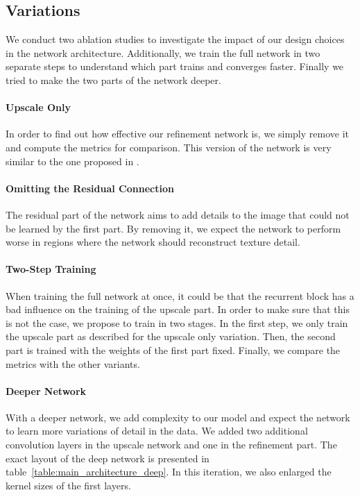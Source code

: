 \documentclass[11pt]{article}
\begin{document}
\subsection{Variations}

We conduct two ablation studies to investigate the impact of our design choices in the network architecture. 
Additionally, we train the full network in two separate steps to understand which part trains and converges faster. 
Finally we tried to make the two parts of the network deeper.

\paragraph{Upscale Only}

In order to find out how effective our refinement network is, we simply remove it and compute the metrics for comparison.
This version of the network is very similar to the one proposed in \citet{dong2016image}.

\paragraph{Omitting the Residual Connection}

The residual part of the network aims to add details to the image that could not be learned by the first part.
By removing it, we expect the network to perform worse in regions where the network should reconstruct texture detail.

\paragraph{Two-Step Training}

When training the full network at once, it could be that the recurrent block has a bad influence on the training of the upscale part.
In order to make sure that this is not the case, we propose to train in two stages.
In the first step, we only train the upscale part as described for the upscale only variation. 
Then, the second part is trained with the weights of the first part fixed.
Finally, we compare the metrics with the other variants.%

\paragraph{Deeper Network}

With a deeper network, we add complexity to our model and expect the network to learn more variations of detail in the data.
We added two additional convolution layers in the upscale network and one in the refinement part.
The exact layout of the deep network is presented in table~\ref{table:main_architecture_deep}.
In this iteration, we also enlarged the kernel sizes of the first layers.
\end{document}
